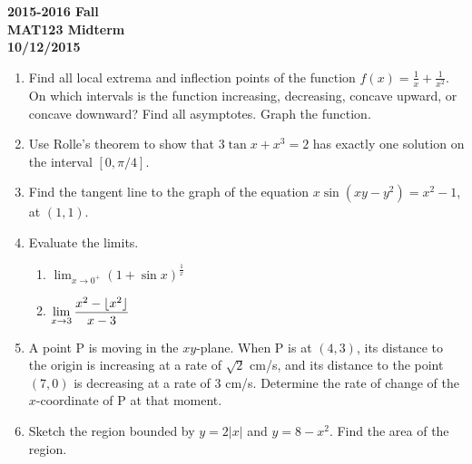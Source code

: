 \documentclass[a4paper, 12pt]{article}
\DeclarePairedDelimiter\floor{\lfloor}{\rfloor}
\begin{document}
\newpage
{}
{}

\begin{center}
\textbf{2015-2016 Fall\\MAT123 Midterm\\10/12/2015}
\end{center}

\begin{enumerate}[leftmargin=*,label=\textbf{\arabic*.}]

\item Find all local extrema and inflection points of the function $f(x)=\frac{1}{x}+\frac{1}{x^2}$. On which intervals is the function increasing, decreasing, concave upward, or concave downward? Find all asymptotes. Graph the function.

\item Use Rolle's theorem to show that $3\tan x + x^3 = 2$ has exactly one solution on the interval $[0,\pi/4]$.

\item Find the tangent line to the graph of the equation $x\sin\left(xy-y^2\right)=x^2-1$, at $(1,1)$.

\item Evaluate the limits.

\begin{enumerate}[leftmargin=*,label=\textbf{\alph*.}]

\item $\displaystyle\lim_{x\to 0^+}(1+\sin x)^{\frac{1}{x}}$

\item $\displaystyle\lim_{x\to 3}\frac{x^2-\floor{x^2}}{x-3}$

\end{enumerate}

\item A point P is moving in the $xy$-plane. When P is at $(4, 3)$, its distance to the origin is increasing at a rate of $\sqrt{2}$ cm/s, and its distance to the point $(7, 0)$ is decreasing at a rate of 3 cm/s. Determine the rate of change of the $x$-coordinate of P at that moment.

\item Sketch the region bounded by $y=2|x|$ and $y=8-x^2$. Find the area of the region.

\end{enumerate}

\newpage
{}
{}
\end{document}
